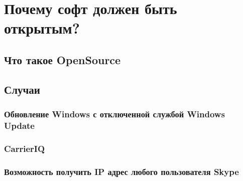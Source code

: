 \chapter{Почему софт должен быть открытым?}
\section{Что такое OpenSource}
\section{Случаи}
\subsection{Обновление Windows с отключенной службой Windows Update}
\subsection{CarrierIQ}
\subsection{Возможность получить IP адрес любого пользователя Skype}